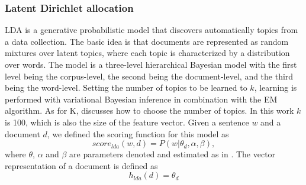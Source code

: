 \documentclass[a4paper]{article}
\begin{document}
\subsubsection{Latent Dirichlet allocation}
LDA \cite{blei2003latent} is a generative probabilistic model that discovers automatically topics from a data collection.
The basic idea is that documents are represented as random mixtures over latent topics, where each topic is characterized by a distribution over words. The model is a three-level hierarchical Bayesian model with the first level being the corpus-level, the second being the document-level, and the third being the word-level. Setting the number of topics to be learned to $k$, learning is performed with variational Bayesian inference in combination with the EM algorithm. As for K, \cite{hoffman2010online} discusses how to choose the number of topics. In this work $k$ is 100, which is also the size of the feature vector.
Given a sentence $w$ and a document $d$, we defined the scoring function for this model as
\begin{equation}
\label{eq:score_lda}
 score_{lda}(w, d) = P(w|\theta_d, \alpha, \beta),
\end{equation}
where $\theta$, $\alpha$ and $\beta$ are parameters denoted and estimated as in \cite{hoffman2010online}.
The vector representation of a document is defined as
\begin{equation}
\label{eq:h_lda}
h_{lda}(d) = \theta_d
\end{equation}
\end{document}
